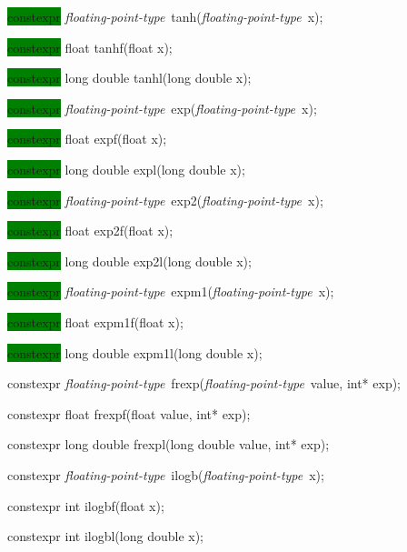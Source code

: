 \documentclass[prd,twocolumn,amsmath,amssymb,nofootinbib,eqsecnum]{revtex4-1}
\newcommand{\highlight}[1]{\colorbox{green}{\!\!\!\! #1}}
\newcommand{\oldhighlight}[1]{#1}
\newcommand{\fptype}{{\it floating-point-type}}
\begin{document}
{\vspace{2ex}


\highlight{constexpr} \fptype\ tanh(\fptype\ x);

\highlight{constexpr} float tanhf(float x);

\highlight{constexpr} long double tanhl(long double x);

\vspace{2ex}


\highlight{constexpr} \fptype\ exp(\fptype\ x);

\highlight{constexpr} float expf(float x);

\highlight{constexpr} long double expl(long double x);

\vspace{2ex}


\highlight{constexpr} \fptype\ exp2(\fptype\ x);

\highlight{constexpr} float exp2f(float x);

\highlight{constexpr} long double exp2l(long double x);

\vspace{2ex}


\highlight{constexpr} \fptype\ expm1(\fptype\ x);

\highlight{constexpr} float expm1f(float x);

\highlight{constexpr} long double expm1l(long double x);

\vspace{2ex}


\oldhighlight{constexpr} \fptype\ frexp(\fptype\ value, int* exp);

\oldhighlight{constexpr}  float frexpf(float value, int* exp);

\oldhighlight{constexpr}  long double frexpl(long double value, int* exp);

\vspace{2ex}


\oldhighlight{constexpr} \fptype\ ilogb(\fptype\ x);

\oldhighlight{constexpr} int ilogbf(float x);

\oldhighlight{constexpr} int ilogbl(long double x);

\vspace{2ex}

}
\end{document}
